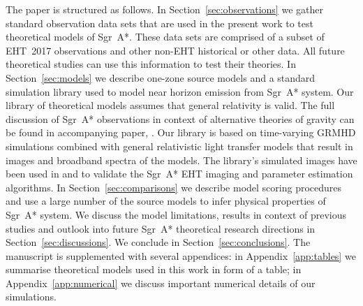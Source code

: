 The paper is structured as follows. In Section~\ref{sec:observations} we gather standard observation data sets that are used in the present work to test theoretical models of Sgr~A*. These data sets are comprised of a subset of EHT~2017 observations and other non-EHT historical or other data. All future theoretical studies can use this information to test their theories. In Section~\ref{sec:models} we describe one-zone source models and a standard simulation library used to model near horizon emission from Sgr~A* system. Our library of theoretical models assumes that general relativity is valid. The full discussion of Sgr~A* observations in context of alternative theories of gravity can be found in accompanying paper, .
Our library is based on time-varying GRMHD simulations combined with general relativistic light transfer models that result in images and broadband spectra of the models. The library's simulated images have been used in  and  to validate the Sgr~A* EHT imaging and parameter estimation algorithms.
In Section~\ref{sec:comparisons} we describe model scoring procedures and use a large number of the source models to infer physical properties of Sgr~A* system. We discuss the model limitations, results in context of previous studies and outlook into future Sgr~A* theoretical research directions in Section~\ref{sec:discussions}. We conclude in Section~\ref{sec:conclusions}.
The manuscript is supplemented with several appendices: in Appendix~\ref{app:tables} we summarise theoretical models used in this work in form of a table; in Appendix~\ref{app:numerical} we discuss important numerical details of our simulations.


